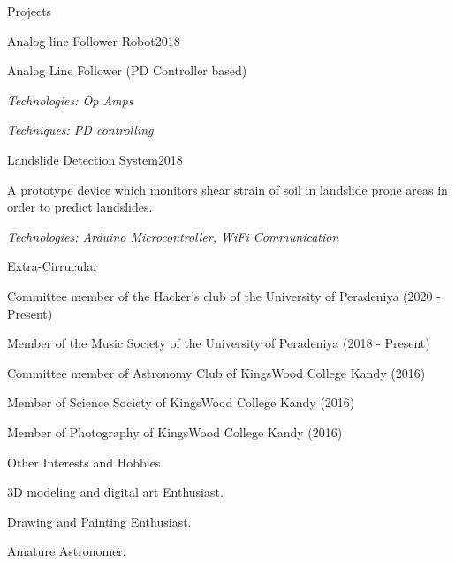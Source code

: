 \documentclass{resume} %
\begin{document}
\begin{rSection}{Projects}
\begin{rSubsection}{Analog line Follower Robot}{2018}{}{}
\item Analog Line Follower (PD Controller based)
\item \textit{Technologies: Op Amps}
\item \textit{Techniques: PD controlling}
\end{rSubsection}

\begin{rSubsection}{Landslide Detection System}{2018}{}{}
\item A prototype device which monitors shear strain of soil in landslide prone areas in order to predict landslides.
\item \textit{Technologies: Arduino Microcontroller, WiFi Communication}
\end{rSubsection}





\end{rSection}

\begin{rSection}{Extra-Cirrucular} \itemsep -3pt
\item Committee member of the Hacker's club of the University of Peradeniya (2020 - Present)
\item Member of the Music Society of the University of Peradeniya (2018 - Present)
\item Committee member of Astronomy Club of KingsWood College Kandy (2016)
\item Member of Science Society of KingsWood College Kandy (2016)
\item Member of Photography of KingsWood College Kandy (2016)

 
\end{rSection}


\begin{rSection}{Other Interests and Hobbies} \itemsep -3pt
\item 3D modeling and digital art Enthusiast.
\item Drawing and Painting Enthusiast.
\item Amature Astronomer.


\end{rSection}

\clearpage

\end{document}
